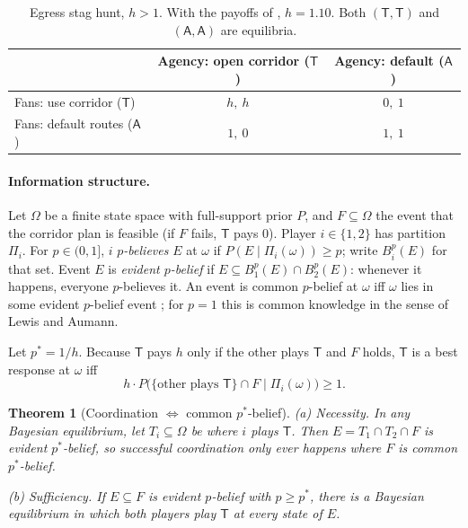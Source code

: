 \documentclass[11pt]{article}
\newtheorem{theorem}{Theorem}
\theoremstyle{definition}
\theoremstyle{remark}
\newcommand{\1}{\mathbf{1}}
\newcommand{\Tog}{\mathsf{T}}
\newcommand{\Alo}{\mathsf{A}}
\begin{document}
\begin{table}[!htbp]
\centering
\begin{tabular}{lcc}
\toprule
 & Agency: open corridor ($\Tog$) & Agency: default ($\Alo$)\\
\midrule
Fans: use corridor ($\Tog$) & $h,\ h$ & $0,\ 1$\\
Fans: default routes ($\Alo$) & $1,\ 0$ & $1,\ 1$\\
\bottomrule
\end{tabular}
\caption{Egress stag hunt, $h>1$. With the payoffs of \cite{dfp},
$h=1.10$. Both $(\Tog,\Tog)$ and $(\Alo,\Alo)$ are equilibria.}
\label{tab:stag}
\end{table}

\paragraph{Information structure.}
Let $\Omega$ be a finite state space with full-support prior $P$, and
$F\subseteq\Omega$ the event that the corridor plan is feasible (if $F$
fails, $\Tog$ pays $0$). Player $i\in\{1,2\}$ has partition $\Pi_i$. For
$p\in(0,1]$, $i$ \emph{$p$-believes} $E$ at $\omega$ if
$P(E\mid\Pi_i(\omega))\ge p$; write $B_i^p(E)$ for that set. Event $E$ is
\emph{evident $p$-belief} if $E\subseteq B_1^p(E)\cap B_2^p(E)$: whenever it
happens, everyone $p$-believes it. An event is common $p$-belief at $\omega$
iff $\omega$ lies in some evident $p$-belief event \cite{ms}; for $p=1$ this
is common knowledge in the sense of Lewis and Aumann.

Let $p^*=1/h$. Because $\Tog$ pays $h$ only if the other plays $\Tog$ and
$F$ holds, $\Tog$ is a best response at $\omega$ iff
\begin{equation}\label{eq:br}
h\cdot P\bigl(\{\text{other plays }\Tog\}\cap F\mid\Pi_i(\omega)\bigr)\ge1.
\end{equation}

\begin{theorem}[Coordination $\iff$ common $p^*$-belief]\label{thm:ck}
\emph{(a) Necessity.} In any Bayesian equilibrium, let
$T_i\subseteq\Omega$ be where $i$ plays $\Tog$. Then
$E=T_1\cap T_2\cap F$ is evident $p^*$-belief, so successful coordination
only ever happens where $F$ is common $p^*$-belief.

\emph{(b) Sufficiency.} If $E\subseteq F$ is evident $p$-belief with
$p\ge p^*$, there is a Bayesian equilibrium in which both players play
$\Tog$ at every state of $E$.
\end{theorem}
\end{document}
